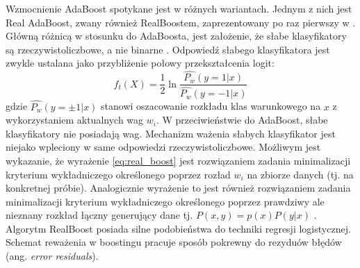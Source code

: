 Wzmocnienie AdaBoost spotykane jest w różnych wariantach.
Jednym z nich jest Real AdaBoost, zwany również RealBoostem, zaprezentowany po raz pierwszy w \cite{10.1023/A:1007614523901}.
Główną różnicą w stosunku do AdaBoosta, jest założenie, że słabe klasyfikatory są rzeczywistoliczbowe, a nie binarne \cite{szybka_detekcja_klesk}.
Odpowiedź słabego klasyfikatora jest zwykle ustalana jako przybliżenie połowy przekształcenia logit:
\begin{equation}
    \label{eq:real_boost}
    f_t(X) =\dfrac{1}{2}\ln\dfrac{\hat{P_w}(y=1|x)}{\hat{P_w}(y=-1|x)}
\end{equation}
gdzie $\hat{P_w}(y=\pm1|x)$ stanowi oszacowanie rozkładu klas warunkowego na $x$ z wykorzystaniem aktualnych wag $w_i$.
W przeciwieństwie do AdaBoost, słabe klasyfikatory nie posiadają wag.
Mechanizm ważenia słabych klasyfikator jest niejako wpleciony w same odpowiedzi rzeczywistoliczbowe.
Możliwym jest wykazanie, że wyrażenie \eqref{eq:real_boost} jest rozwiązaniem zadania minimalizacji kryterium wykładniczego określonego poprzez rozład ${w_i}$ na zbiorze danych (tj. na konkretnej próbie).
Analogicznie wyrażenie to jest również rozwiązaniem zadania minimalizacji kryterium wykładniczego określonego poprzez prawdziwy ale nieznany rozkład łączny generujący dane tj. $P(x,y)=p(x)P(y|x)$ \cite{szybka_detekcja_klesk}.
Algorytm RealBoost posiada silne podobieństwa do techniki regresji logistycznej.
Schemat reważenia w boostingu pracuje sposób pokrewny do rezyduów błędów (ang. \textit{error residuals}).

